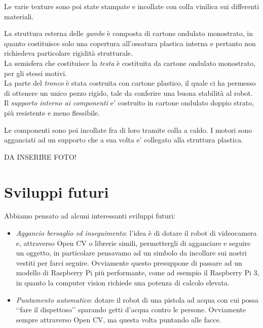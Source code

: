 \documentclass[12pt]{article}
\newcommand{\cbegin}{‘‘}
\newcommand{\cend}{’’}
\newcommand{\raspi}{Raspberry Pi}
\begin{document}
Le varie texture sono poi state stampate e incollate con colla vinilica sui differenti materiali.

\bigskip

La struttura esterna delle \emph{gambe} è composta di cartone ondulato monostrato, in quanto costituisce solo una copertura all'ossatura plastica interna e pertanto non richiedeva particolare rigidità strutturale.\\
La semisfera che costituisce la \emph{testa} è costituita da cartone ondulato monostrato, per gli stessi motivi.\\
La parte del \emph{tronco} è stata costruita con cartone plastico, il quale ci ha permesso di ottenere un unico pezzo rigido, tale da conferire una buona stabilità al robot.\\
Il \emph{supporto interno ai componenti} e' costruito in cartone ondulato doppio strato, più resistente e meno flessibile.

Le componenti sono poi incollate fra di loro tramite colla a caldo.
I motori sono agganciati ad un supporto che a sua volta e' collegato alla struttura plastica. 

\bigskip

DA INSERIRE FOTO!

\section{Sviluppi futuri}

Abbiamo pensato ad alcuni interessanti sviluppi futuri:

\begin{itemize}
\item \emph{Aggancio bersaglio ed inseguimento}: l'idea è di dotare il robot di videocamera e, attraverso Open CV o librerie simili, permettergli di agganciare e seguire un oggetto, in particolare pensavamo ad un simbolo da incollare sui nostri vestiti per farci seguire. Ovviamente questo presuppone di passare ad un modello di \raspi{} più performante, come ad esempio il \raspi{} 3, in quanto la computer vision richiede una potenza di calcolo elevata.
\item \emph{Puntamento automatico}: dotare il robot di una pistola ad acqua con cui possa \cbegin fare il dispettoso\cend{} sparando getti d'acqua contro le persone. Ovviamente sempre attraverso Open CV, ma questa volta puntando alle facce.

\end{itemize}
\end{document}
